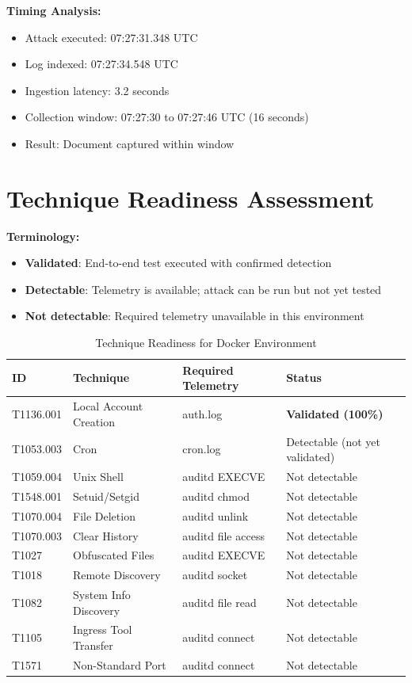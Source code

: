 \documentclass[11pt,a4paper]{article}
\begin{document}
\textbf{Timing Analysis:}
\begin{itemize}
    \item Attack executed: 07:27:31.348 UTC
    \item Log indexed: 07:27:34.548 UTC
    \item Ingestion latency: 3.2 seconds
    \item Collection window: 07:27:30 to 07:27:46 UTC (16 seconds)
    \item Result: Document captured within window
\end{itemize}

\section{Technique Readiness Assessment}
\label{sec:readiness}

\textbf{Terminology:}
\begin{itemize}
    \item \textbf{Validated}: End-to-end test executed with confirmed detection
    \item \textbf{Detectable}: Telemetry is available; attack can be run but not yet tested
    \item \textbf{Not detectable}: Required telemetry unavailable in this environment
\end{itemize}

\begin{table}[H]
    \centering
    \caption{Technique Readiness for Docker Environment}
    \label{tab:readiness}
    \begin{tabular}{llll}
        \toprule
        \textbf{ID} & \textbf{Technique} & \textbf{Required Telemetry} & \textbf{Status} \\
        \midrule
        T1136.001 & Local Account Creation & auth.log & \textbf{Validated (100\%)} \\
        T1053.003 & Cron & cron.log & Detectable (not yet validated) \\
        \midrule
        T1059.004 & Unix Shell & auditd EXECVE & Not detectable \\
        T1548.001 & Setuid/Setgid & auditd chmod & Not detectable \\
        T1070.004 & File Deletion & auditd unlink & Not detectable \\
        T1070.003 & Clear History & auditd file access & Not detectable \\
        T1027 & Obfuscated Files & auditd EXECVE & Not detectable \\
        T1018 & Remote Discovery & auditd socket & Not detectable \\
        T1082 & System Info Discovery & auditd file read & Not detectable \\
        T1105 & Ingress Tool Transfer & auditd connect & Not detectable \\
        T1571 & Non-Standard Port & auditd connect & Not detectable \\
        \bottomrule
    \end{tabular}
\end{table}
\end{document}
